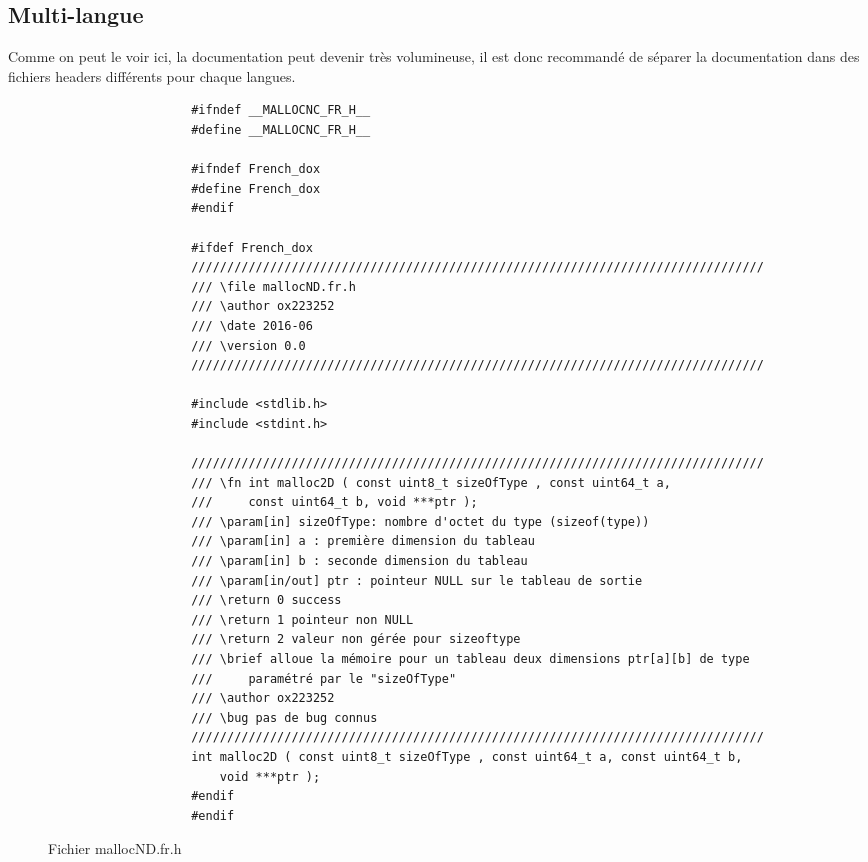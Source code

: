 		\subsection{Multi-langue}

			Comme on peut le voir ici, la documentation peut devenir très volumineuse, il est donc recommandé de séparer la documentation dans des fichiers headers différents pour chaque langues.

			\begin{figure}[H]
				\begin{changemargin}{-2.5cm}{-2.5cm}
				\begin{tcolorbox}
				\begin{verbatim}
					#ifndef __MALLOCNC_FR_H__
					#define __MALLOCNC_FR_H__

					#ifndef French_dox
					#define French_dox
					#endif

					#ifdef French_dox
					////////////////////////////////////////////////////////////////////////////////
					/// \file mallocND.fr.h
					/// \author ox223252
					/// \date 2016-06
					/// \version 0.0
					////////////////////////////////////////////////////////////////////////////////

					#include <stdlib.h>
					#include <stdint.h>

					////////////////////////////////////////////////////////////////////////////////
					/// \fn int malloc2D ( const uint8_t sizeOfType , const uint64_t a,
					/// 	const uint64_t b, void ***ptr );
					/// \param[in] sizeOfType: nombre d'octet du type (sizeof(type))
					/// \param[in] a : première dimension du tableau
					/// \param[in] b : seconde dimension du tableau
					/// \param[in/out] ptr : pointeur NULL sur le tableau de sortie
					/// \return 0 success
					/// \return 1 pointeur non NULL
					/// \return 2 valeur non gérée pour sizeoftype
					/// \brief alloue la mémoire pour un tableau deux dimensions ptr[a][b] de type 
					/// 	paramétré par le "sizeOfType"
					/// \author ox223252
					/// \bug pas de bug connus
					////////////////////////////////////////////////////////////////////////////////
					int malloc2D ( const uint8_t sizeOfType , const uint64_t a, const uint64_t b, 
					    void ***ptr );
					#endif
					#endif
				\end{verbatim}
				\end{tcolorbox}
				\end{changemargin}
				\caption{Fichier mallocND.fr.h}
			\end{figure}

